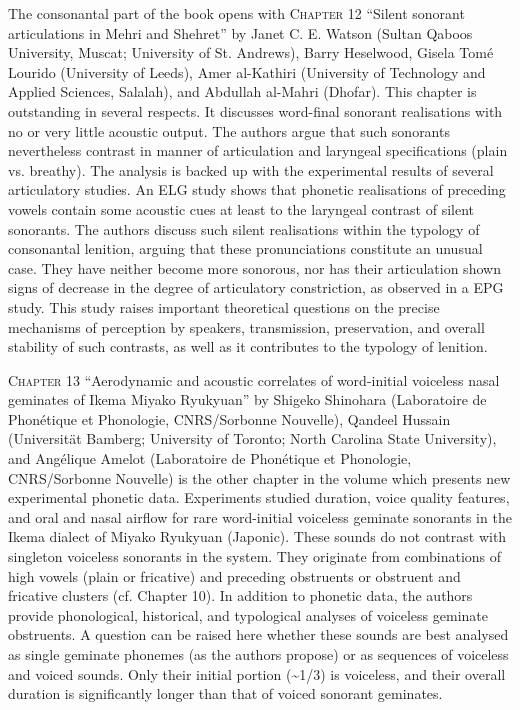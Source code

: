 \documentclass[output=paper]{langscibook}
\begin{document}
The consonantal part of the book opens with \textsc{Chapter 12} “Silent sonorant articulations in Mehri and Shehret” by Janet C. E. Watson (Sultan Qaboos University, Muscat; University of St. Andrews), Barry Heselwood, Gisela Tomé Lourido (University of Leeds), Amer al-Kathiri (University of Technology and Applied Sciences, Salalah), and Abdullah al-Mahri (Dhofar). This chapter is outstanding in several respects. It discusses word-final sonorant realisations with no or very little acoustic output. The authors argue that such sonorants nevertheless contrast in manner of articulation and laryngeal specifications (plain vs. breathy). The analysis is backed up with the experimental results of several articulatory studies. An ELG study shows that phonetic realisations of preceding vowels contain some acoustic cues at least to the laryngeal contrast of silent sonorants. The authors discuss such silent realisations within the typology of consonantal lenition, arguing that these pronunciations constitute an unusual case. They have neither become more sonorous, nor has their articulation shown signs of decrease in the degree of articulatory constriction, as observed in a EPG study. This study raises important theoretical questions on the precise mechanisms of perception by speakers, transmission, preservation, and overall stability of such contrasts, as well as it contributes to the typology of lenition.

\textsc{Chapter 13} “Aerodynamic and acoustic correlates of word-initial voiceless nasal geminates of Ikema Miyako Ryukyuan” by Shigeko Shinohara (Laboratoire de Phonétique et Phonologie, CNRS/Sorbonne Nouvelle), Qandeel Hussain (Universität Bamberg; University of Toronto; North Carolina State University), and Angélique Amelot (Laboratoire de Phonétique et Phonologie, CNRS/Sorbonne Nouvelle) is the other chapter in the volume which presents new experimental phonetic data. Experiments studied duration, voice quality features, and oral and nasal airflow for rare word-initial voiceless geminate sonorants in the Ikema dialect of Miyako Ryukyuan (Japonic). These sounds do not contrast with singleton voiceless sonorants in the system. They originate from combinations of high vowels (plain or fricative) and preceding obstruents or obstruent and fricative clusters (cf. Chapter 10). In addition to phonetic data, the authors provide phonological, historical, and typological analyses of voiceless geminate obstruents. A question can be raised here whether these sounds are best analysed as single geminate phonemes (as the authors propose) or as sequences of voiceless and voiced sounds. Only their initial portion ({\textasciitilde}1/3) is voiceless, and their overall duration is significantly longer than that of voiced sonorant geminates.
\end{document}
